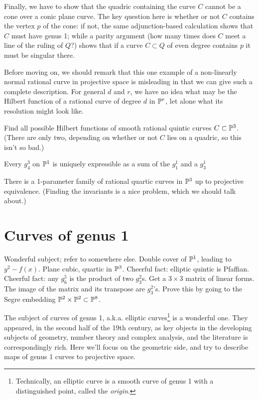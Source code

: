 Finally, we have to show that the quadric containing the curve $C$ cannot be a cone over a conic plane curve. The key question here is whether or not $C$ contains the vertex $p$ of the cone: if not, the same adjunction-based calculation shows that $C$ must have genus 1; while a parity argument (how many times does $C$ meet a line of the ruling of $Q$?) shows that if a curve $C \subset Q$ of even degree contains $p$ it must be singular there.

Before moving on, we should remark that this one example of a non-linearly normal rational curve in projective space is misleading in that we can give such a complete description. For general $d$ and $r$, we have no idea what may be the Hilbert function of a rational curve of degree $d$ in $\PP^r$, let alone what its resolution might look like.


\begin{exercise}
Find all possible Hilbert functions of smooth rational quintic  curves $C \subset \PP^3$. (There are only two, depending on whether or not $C$ lies on a quadric, so this isn't so bad.)
\end{exercise}

\begin{exercise}
Every $g^3_4$ on $\PP^1$ is uniquely expressible as a sum of the $g_1^1$ and a $g^1_3$
\end{exercise}

\begin{exercise}
There is a 1-parameter family of rational quartic curves in $\PP^3$ up to projective equivalence. (Finding the invariants is a nice problem, which we should talk about.)
\end{exercise}


\section{Curves of genus 1}

Wonderful subject; refer to somewhere else. Double cover of $\PP^1$, leading to $y^2 - f(x)$. Plane cubic, quartic in $\PP^3$. Cheerful fact:  elliptic quintic is Pfaffian. Cheerful fact: any $g^5_6$ is the product of two $g^2_3$s. Get a $3\times 3$ matrix of linear forms. The image of the matrix and its transpose are $g^2_3$'s. Prove this by going to the Segre embedding $\PP^2\times \PP^2 \subset\PP^8$.

The subject of curves of genus 1, a.k.a. elliptic curves\footnote{Technically, an elliptic curve is a smooth curve of genus 1 with a distinguished point, called the \emph{origin}.} is a wonderful one. They appeared, in the second half of the 19th century, as key objects in the developing subjects of geometry, number theory and complex analysis, and the literature is correspondingly rich. Here we'll focus on the geometric side, and try to describe maps of genus 1 curves to projective space.

